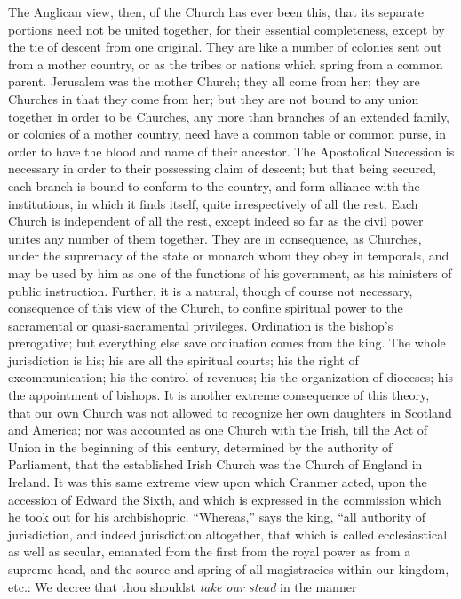 The Anglican view, then, of the Church has ever
been this, that its separate portions need not be united together, for
their essential completeness, except by the tie of descent from one
original. They are like a number of colonies sent out from a mother
country, or as the tribes or nations which spring from a common
parent. Jerusalem was the mother Church; they all come from her; they
are Churches in that they come from her; but they are not bound to any
union together in order to be Churches, any more than branches of an
extended family, or colonies of a mother country, need have a common
table or common purse, in order to have the blood and name of their
ancestor. The Apostolical Succession is necessary in order to their
possessing claim of descent; but that being secured, each branch is
bound to conform to the country, and form alliance with the
institutions, in which it finds itself, quite irrespectively of all
the rest. Each Church is independent of all the rest, except indeed so
far as the civil power unites any number of them together. They are in
consequence, as Churches, under the supremacy of the state or monarch
whom they obey in temporals, and may be used by him as one of the
functions of his government, as his ministers of public instruction.
Further, it is a natural, though of course not necessary, consequence
of this view of the Church, to confine spiritual power to the
sacramental or quasi-sacramental privileges. Ordination is the bishop's
prerogative; but everything else save ordination comes from the
king. The whole jurisdiction is his; his are all the spiritual courts;
his the right of excommunication; his the control of revenues; his the
organization of dioceses; his the appointment of bishops. It is
another extreme consequence of this theory, that our own Church was
not allowed to recognize her own daughters in Scotland and America;
nor was accounted as one Church with the Irish, till the Act of Union
in the beginning of this century, determined by the authority of
Parliament, that the established Irish Church was the Church of
England in Ireland. It was this same extreme view upon which Cranmer
acted, upon the accession of Edward the Sixth, and which is expressed
in the commission which he took out for his archbishopric. ``Whereas,''
says the king, ``all authority of jurisdiction, and indeed jurisdiction
altogether, that which is called ecclesiastical as well as secular,
emanated from the first from the royal power as from a supreme head,
and the source and spring of all magistracies within our kingdom,
etc.: We decree that thou shouldst \emph{take our stead} in the manner
